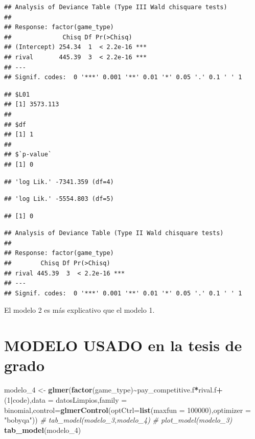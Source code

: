 \documentclass[
]{article}
\newenvironment{Shaded}{\begin{snugshade}}{\end{snugshade}}
\newcommand{\AttributeTok}[1]{\textcolor[rgb]{0.13,0.29,0.53}{#1}}
\newcommand{\CommentTok}[1]{\textcolor[rgb]{0.56,0.35,0.01}{\textit{#1}}}
\newcommand{\DecValTok}[1]{\textcolor[rgb]{0.00,0.00,0.81}{#1}}
\newcommand{\FunctionTok}[1]{\textcolor[rgb]{0.13,0.29,0.53}{\textbf{#1}}}
\newcommand{\NormalTok}[1]{#1}
\newcommand{\OtherTok}[1]{\textcolor[rgb]{0.56,0.35,0.01}{#1}}
\newcommand{\SpecialCharTok}[1]{\textcolor[rgb]{0.81,0.36,0.00}{\textbf{#1}}}
\newcommand{\StringTok}[1]{\textcolor[rgb]{0.31,0.60,0.02}{#1}}
\begin{document}
\begin{verbatim}
## Analysis of Deviance Table (Type III Wald chisquare tests)
## 
## Response: factor(game_type)
##              Chisq Df Pr(>Chisq)    
## (Intercept) 254.34  1  < 2.2e-16 ***
## rival       445.39  3  < 2.2e-16 ***
## ---
## Signif. codes:  0 '***' 0.001 '**' 0.01 '*' 0.05 '.' 0.1 ' ' 1
\end{verbatim}

\begin{verbatim}
## $L01
## [1] 3573.113
## 
## $df
## [1] 1
## 
## $`p-value`
## [1] 0
\end{verbatim}

\begin{verbatim}
## 'log Lik.' -7341.359 (df=4)
\end{verbatim}

\begin{verbatim}
## 'log Lik.' -5554.803 (df=5)
\end{verbatim}

\begin{verbatim}
## [1] 0
\end{verbatim}

\begin{verbatim}
## Analysis of Deviance Table (Type II Wald chisquare tests)
## 
## Response: factor(game_type)
##        Chisq Df Pr(>Chisq)    
## rival 445.39  3  < 2.2e-16 ***
## ---
## Signif. codes:  0 '***' 0.001 '**' 0.01 '*' 0.05 '.' 0.1 ' ' 1
\end{verbatim}

El modelo 2 es más explicativo que el modelo 1.

\hypertarget{modelo-usado-en-la-tesis-de-grado}{%
\section{MODELO USADO en la tesis de
grado}\label{modelo-usado-en-la-tesis-de-grado}}

\begin{Shaded}
\begin{Highlighting}[]
\NormalTok{modelo\_4 }\OtherTok{\textless{}{-}} \FunctionTok{glmer}\NormalTok{(}\FunctionTok{factor}\NormalTok{(game\_type)}\SpecialCharTok{\textasciitilde{}}\NormalTok{pay\_competitive.f}\SpecialCharTok{*}\NormalTok{rival.f}\SpecialCharTok{+}\NormalTok{(}\DecValTok{1}\SpecialCharTok{|}\NormalTok{code),}\AttributeTok{data =}\NormalTok{ datosLimpios,}\AttributeTok{family =}\NormalTok{ binomial,}\AttributeTok{control=}\FunctionTok{glmerControl}\NormalTok{(}\AttributeTok{optCtrl=}\FunctionTok{list}\NormalTok{(}\AttributeTok{maxfun =} \DecValTok{100000}\NormalTok{),}\AttributeTok{optimizer =} \StringTok{"bobyqa"}\NormalTok{))}
\CommentTok{\# tab\_model(modelo\_3,modelo\_4)}
\CommentTok{\# plot\_model(modelo\_3)}
\FunctionTok{tab\_model}\NormalTok{(modelo\_4)}
\end{Highlighting}
\end{Shaded}
\end{document}
